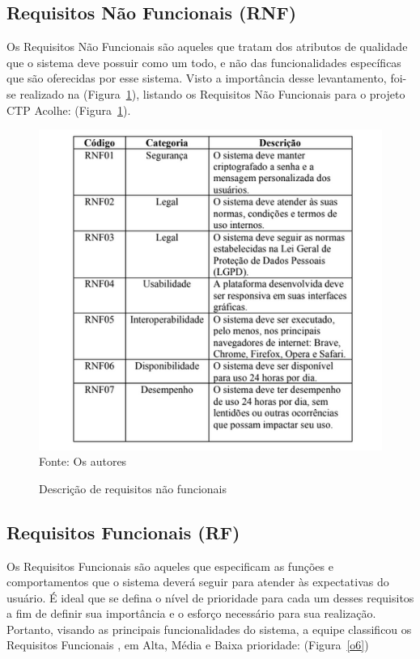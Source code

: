 \documentclass[12pt,a4paper]{article}
\begin{document}
\subsection{Requisitos Não Funcionais (RNF)}
Os Requisitos Não Funcionais são aqueles que tratam dos atributos de qualidade que o sistema deve possuir como um todo, e não das funcionalidades específicas que são oferecidas por esse sistema. Visto a importância desse levantamento, foi-se realizado na (Figura~\ref{fig05}), listando os Requisitos Não Funcionais para o projeto \gls{CTP Acolhe}: (Figura~\ref{fig05}). \cite{artigo, blog, codificar}

\begin{figure}[H]
    \centering
    \caption{Descrição de requisitos não funcionais}
     \includegraphics[width=13cm]{img05.png} \\
    Fonte: Os autores
    \label{fig05}
\end{figure}

\newpage

\subsection{Requisitos Funcionais (RF)}
Os Requisitos Funcionais são aqueles que especificam as funções e comportamentos que o sistema deverá seguir para atender às expectativas do usuário. É ideal que se defina o nível de prioridade para cada um desses requisitos a fim de definir sua importância e o esforço necessário para sua realização. Portanto, visando as principais funcionalidades do sistema, a equipe classificou os Requisitos Funcionais \cite{codificar}, em Alta, Média e Baixa prioridade: (Figura~\ref{o6})
\end{document}
